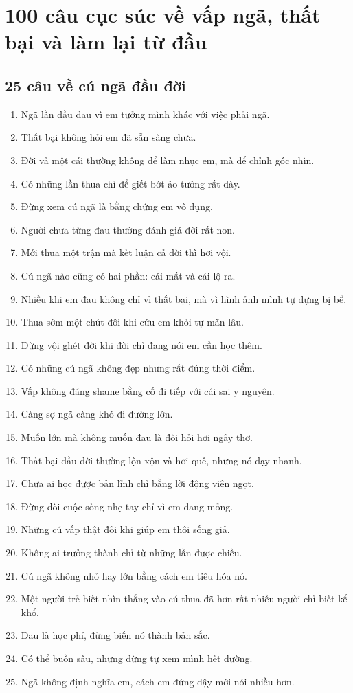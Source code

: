 \chapter{100 câu cục súc về vấp ngã, thất bại và làm lại từ đầu}

\section{25 câu về cú ngã đầu đời}
\begin{enumerate}[leftmargin=*]
\item Ngã lần đầu đau vì em tưởng mình khác với việc phải ngã.
\item Thất bại không hỏi em đã sẵn sàng chưa.
\item Đời vả một cái thường không để làm nhục em, mà để chỉnh góc nhìn.
\item Có những lần thua chỉ để giết bớt ảo tưởng rất dày.
\item Đừng xem cú ngã là bằng chứng em vô dụng.
\item Người chưa từng đau thường đánh giá đời rất non.
\item Mới thua một trận mà kết luận cả đời thì hơi vội.
\item Cú ngã nào cũng có hai phần: cái mất và cái lộ ra.
\item Nhiều khi em đau không chỉ vì thất bại, mà vì hình ảnh mình tự dựng bị bể.
\item Thua sớm một chút đôi khi cứu em khỏi tự mãn lâu.
\item Đừng vội ghét đời khi đời chỉ đang nói em cần học thêm.
\item Có những cú ngã không đẹp nhưng rất đúng thời điểm.
\item Vấp không đáng shame bằng cố đi tiếp với cái sai y nguyên.
\item Càng sợ ngã càng khó đi đường lớn.
\item Muốn lớn mà không muốn đau là đòi hỏi hơi ngây thơ.
\item Thất bại đầu đời thường lộn xộn và hơi quê, nhưng nó dạy nhanh.
\item Chưa ai học được bản lĩnh chỉ bằng lời động viên ngọt.
\item Đừng đòi cuộc sống nhẹ tay chỉ vì em đang mỏng.
\item Những cú vấp thật đôi khi giúp em thôi sống giả.
\item Không ai trưởng thành chỉ từ những lần được chiều.
\item Cú ngã không nhỏ hay lớn bằng cách em tiêu hóa nó.
\item Một người trẻ biết nhìn thẳng vào cú thua đã hơn rất nhiều người chỉ biết kể khổ.
\item Đau là học phí, đừng biến nó thành bản sắc.
\item Có thể buồn sâu, nhưng đừng tự xem mình hết đường.
\item Ngã không định nghĩa em, cách em đứng dậy mới nói nhiều hơn.
\end{enumerate}


